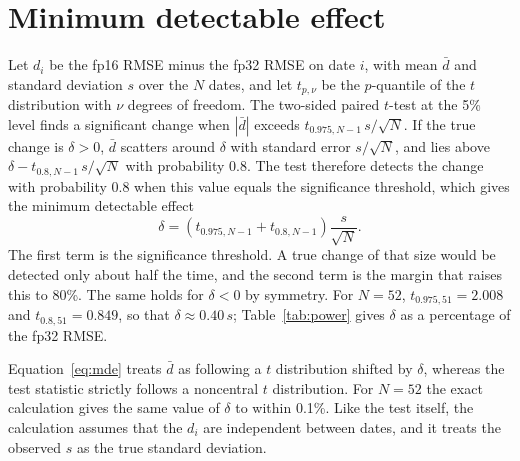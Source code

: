 \section{Minimum detectable effect}
\label{sec:appendix-mde}

Let $d_i$ be the fp16 RMSE minus the fp32 RMSE on date $i$, with mean
$\bar d$ and standard deviation $s$ over the $N$ dates, and let
$t_{p,\nu}$ be the $p$-quantile of the $t$ distribution with $\nu$ degrees
of freedom. The two-sided paired $t$-test at the 5\% level finds a
significant change when $|\bar d|$ exceeds $t_{0.975,N-1}\,s/\sqrt{N}$.
If the true change is $\delta>0$, $\bar d$ scatters around $\delta$ with
standard error $s/\sqrt{N}$, and lies above
$\delta-t_{0.8,N-1}\,s/\sqrt{N}$ with probability 0.8. The test therefore
detects the change with probability 0.8 when this value equals the
significance threshold, which gives the minimum detectable effect
\begin{equation}
\delta=\left(t_{0.975,N-1}+t_{0.8,N-1}\right)\frac{s}{\sqrt{N}}.
\label{eq:mde}
\end{equation}
The first term is the significance threshold. A true change of that size
would be detected only about half the time, and the second term is the
margin that raises this to 80\%. The same holds for $\delta<0$ by symmetry.
For $N=52$, $t_{0.975,51}=2.008$ and $t_{0.8,51}=0.849$, so that
$\delta\approx0.40\,s$; Table~\ref{tab:power} gives $\delta$ as a percentage
of the fp32 RMSE.

Equation~\eqref{eq:mde} treats $\bar d$ as following a $t$ distribution
shifted by $\delta$, whereas the test statistic strictly follows a
noncentral $t$ distribution. For $N=52$ the exact calculation gives the
same value of $\delta$ to within 0.1\%. Like the test itself, the
calculation assumes that the $d_i$ are independent between dates, and it
treats the observed $s$ as the true standard deviation.
